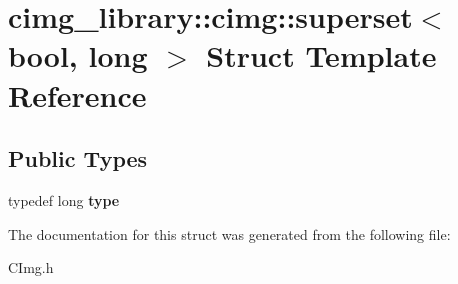 \hypertarget{structcimg__library_1_1cimg_1_1superset_3_01bool_00_01long_01_4}{\section{cimg\-\_\-library\-:\-:cimg\-:\-:superset$<$ bool, long $>$ Struct Template Reference}
\label{structcimg__library_1_1cimg_1_1superset_3_01bool_00_01long_01_4}
}
\subsection*{Public Types}
\begin{DoxyCompactItemize}
\item 
\hypertarget{structcimg__library_1_1cimg_1_1superset_3_01bool_00_01long_01_4_a968bfdf4065f1a6fe644f6f6b2b76ed0}{typedef long {\bfseries type}}\label{structcimg__library_1_1cimg_1_1superset_3_01bool_00_01long_01_4_a968bfdf4065f1a6fe644f6f6b2b76ed0}

\end{DoxyCompactItemize}


The documentation for this struct was generated from the following file\-:\begin{DoxyCompactItemize}
\item 
C\-Img.\-h\end{DoxyCompactItemize}
